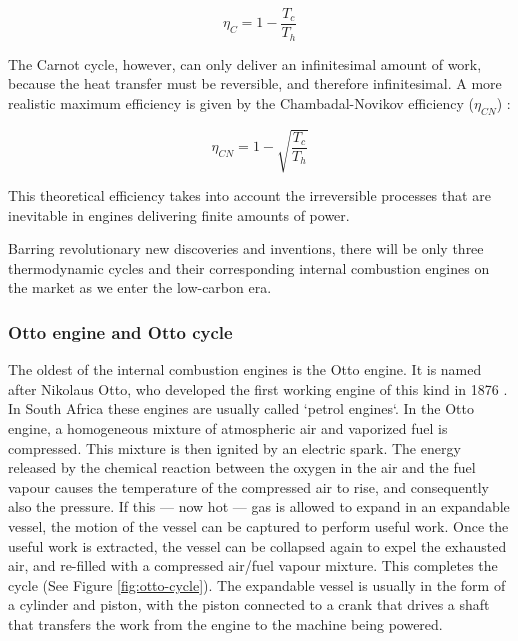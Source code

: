 \[
	\eta_{C} = 1 - \frac{T_c}{T_h}
\]

The Carnot cycle, however, can only deliver an infinitesimal amount of work,
because the heat transfer must be reversible, and therefore infinitesimal. A
more realistic maximum efficiency is given by the Chambadal-Novikov efficiency
(\(\eta_{CN}\)) \autocite{Hoffmann2008}:

\[
	\eta_{CN} = 1 - \sqrt{\frac{T_c}{T_h}}
\]

This theoretical efficiency takes into account the irreversible processes that
are inevitable in engines delivering finite amounts of power.

Barring revolutionary new discoveries and inventions, there will be only three
thermodynamic cycles and their corresponding internal combustion engines on the
market as we enter the low-carbon era.

\subsubsection{Otto engine and Otto cycle}

The oldest of the internal combustion engines is the Otto engine. It is named
after Nikolaus Otto, who developed the first working engine of this kind in 1876
\autocite[Chapter 9]{Cummins1989}. In South Africa these engines are usually
called `petrol engines`. In the Otto engine, a homogeneous mixture of
atmospheric air and vaporized fuel is compressed. This mixture is then ignited
by an electric spark. The energy released by the chemical reaction between the
oxygen in the air and the fuel vapour causes the temperature of the compressed
air to rise, and consequently also the pressure. If this --- now hot --- gas is
allowed to expand in an expandable vessel, the motion of the vessel can be
captured to perform useful work. Once the useful work is extracted, the vessel
can be collapsed again to expel the exhausted air, and re-filled with a
compressed air/fuel vapour mixture. This completes the cycle (See Figure
\ref{fig:otto-cycle}). The expandable vessel is usually in the form of a
cylinder and piston, with the piston connected to a crank that drives a shaft
that transfers the work from the engine to the machine being powered.

